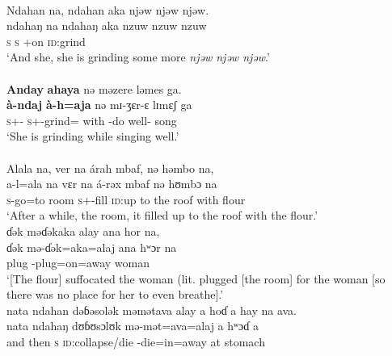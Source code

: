 \\
 Ndahan  na,  ndahan  aka  njəw  njəw  njəw.\\   
\gll  ndahaŋ  na ndahaŋ aka {nzuw  nzuw  nzuw}\\
      \textsc{s}  {\PSP}  \textsc{s}   {\EXT}+on  {\textsc{id}:grind}\\
\glt  ‘And she, she is grinding some more \textit{njəw  njəw  njəw}.’ \\
\medskip
{}\\
\textbf{Anday}  \textbf{ahaya}  nə  məzere  ləmes  ga.\\ 
\gll  \textbf{à-ndaj} \textbf{à-h=aja} nə mɪ{}-ʒɛr-ɛ lɪmɛʃ ga\\
      \textsc{s}+{\PFV}-{\PRG}  \textsc{s}+{\PFV}-grind={\PLU}  with   {\NOM}{}-{do well}-{\CL}  song     {\ADJ}\\
\glt  ‘She is grinding while singing well.’\\

\medskip
{}\\
Alala  na,  ver  na  árah  mbaf,  nə  həmbo  na, \\  
\gll  a-l=ala na vɛr na á-rəx  mbaf nə  hʊmbɔ   na\\
      \textsc{s}-go=to   {\PSP}  room     {\PSP}  \textsc{s}+{\IFV}-fill  {\textsc{id}:up to the roof}  with  flour  {\PSP}\\
\glt  ‘After a while, the room, it filled up to the roof with the flour.’\\

\medskip
ɗək  məɗəkaka  alay  ana  hor  na,\\ 
\gll  ɗək mə-ɗək=aka=alaj ana hʷɔr na\\
      plug    {\NOM}{}-plug=on=away     {\DAT}  woman  {\PSP}\\
\glt  ‘[The flour] suffocated the woman (lit. plugged [the room] for the woman [so there was no place for her to even breathe].’ \\

\medskip
nata  ndahan  dəɓəsolək  məmətava  alay  a  hoɗ  a  hay  na  ava.\\
\gll  nata ndahaŋ dʊɓʊsɔlʊk mə-mət=ava=alaj a hʷɔɗ a \\ 
      {and then}  \textsc{s}   {\textsc{id}:collapse/die}  {\NOM}-die=in=away   at  stomach {\GEN}   \\  


